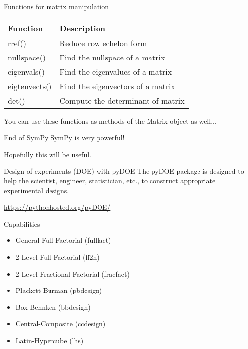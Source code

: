 \documentclass[10pt]{beamer}
\begin{document}

\begin{frame}{Functions for matrix manipulation}
\begin{table}
\begin{tabular}{ll}
\textbf{Function} & \textbf{Description}  \\
\hline
rref() & Reduce row echelon form \\
nullspace() & Find the nullspace of a matrix \\
eigenvals() & Find the eigenvalues of a matrix \\
eigtenvects() & Find the eigenvectors of a matrix \\
det() & Compute the determinant of matrix
\end{tabular}
\end{table}

You can use these functions as methods of the Matrix object as well...
\end{frame}

\begin{frame}{End of SymPy}
SymPy is very powerful!

Hopefully this will be useful. 
\end{frame}

\begin{frame}{Design of experiments (DOE) with pyDOE}
The pyDOE package is designed to help the scientist, engineer, statistician, etc., to construct appropriate experimental designs.

\url{https://pythonhosted.org/pyDOE/}

Capabilities
\begin{itemize}
\item General Full-Factorial (fullfact)
\item 2-Level Full-Factorial (ff2n)
\item 2-Level Fractional-Factorial (fracfact)
\item Plackett-Burman (pbdesign)
\item Box-Behnken (bbdesign)
\item Central-Composite (ccdesign)
\item Latin-Hypercube (lhs)
\end{itemize}
\end{frame}
\end{document}
